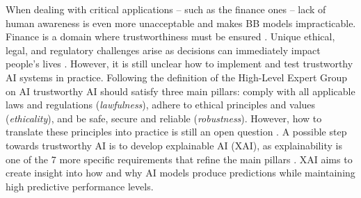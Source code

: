 \documentclass[sigconf]{acmart}
\begin{document}
When dealing with critical applications -- such as the finance ones -- lack of human awareness is even more unacceptable and makes BB models impracticable. 
%
Finance is a domain where trustworthiness must be ensured \cite{ng2015ethical}. Unique ethical, legal, and regulatory challenges arise as decisions can immediately impact people's lives \cite{weiss2021business}. 
%
However, it is still unclear how to implement and test trustworthy AI systems in practice. Following the definition of the High-Level Expert Group on AI \cite{egtai} trustworthy AI should satisfy three main pillars: comply with all applicable laws and regulations (\emph{lawfulness}), adhere to ethical principles and values (\emph{ethicality}), and be safe, secure and reliable (\emph{robustness}). However, how to translate these principles into practice is still an open question \cite{mittelstadt2019principles}.
%
A possible step towards trustworthy AI is to develop explainable AI (XAI), as explainability is one of the 7 more specific requirements that refine the main pillars \cite{egtai}. XAI aims to create insight into how and why AI models produce predictions while maintaining high predictive performance levels.
%

%
%
%
%
%
%
\end{document}
